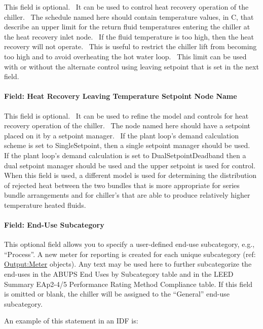 This field is optional.~ It can be used to control heat recovery operation of the chiller.~ The schedule named here should contain temperature values, in C, that describe an upper limit for the return fluid temperatures entering the chiller at the heat recovery inlet node.~ If the fluid temperature is too high, then the heat recovery will not operate.~ This is useful to restrict the chiller lift from becoming too high and to avoid overheating the hot water loop.~ This limit can be used with or without the alternate control using leaving setpoint that is set in the next field.

\paragraph{Field: Heat Recovery Leaving Temperature Setpoint Node Name}\label{field-heat-recovery-leaving-temperature-setpoint-node-name}

This field is optional.~ It can be used to refine the model and controls for heat recovery operation of the chiller.~ The node named here should have a setpoint placed on it by a setpoint manager.~ If the plant loop's demand calculation scheme is set to SingleSetpoint, then a single setpoint manager should be used.~ If the plant loop's demand calculation is set to DualSetpointDeadband then a dual setpoint manager should be used and the upper setpoint is used for control.~ When this field is used, a different model is used for determining the distribution of rejected heat between the two bundles that is more appropriate for series bundle arrangements and for chiller's that are able to produce relatively higher temperature heated fluids.

\paragraph{Field: End-Use Subcategory}\label{end-use-subcategory-13}

This optional field allows you to specify a user-defined end-use subcategory, e.g., ``Process''. A new meter for reporting is created for each unique subcategory (ref: \hyperref[outputmeter-and-outputmetermeterfileonly]{Output:Meter} objects). Any text may be used here to further subcategorize the end-uses in the ABUPS End Uses by Subcategory table and in the LEED Summary EAp2-4/5 Performance Rating Method Compliance table. If this field is omitted or blank, the chiller will be assigned to the ``General'' end-use subcategory.


An example of this statement in an IDF is:

